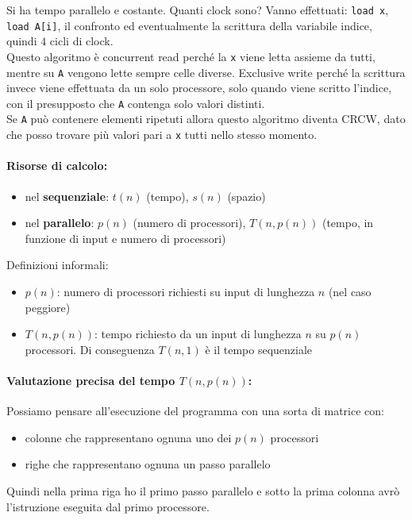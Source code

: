 Si ha tempo parallelo e costante. Quanti clock sono? Vanno effettuati: \texttt{load x}, \texttt{load A[i]}, il confronto ed eventualmente la scrittura della variabile indice, quindi $4$ cicli di clock.\\

Questo algoritmo è concurrent read perché la \texttt{x} viene letta assieme da tutti, mentre su \texttt{A} vengono lette sempre celle diverse. Exclusive write perché la scrittura invece viene effettuata da un solo processore, solo quando viene scritto l'indice, con il presupposto che \texttt{A} contenga solo valori distinti.\\

Se \texttt{A} può contenere elementi ripetuti allora questo algoritmo diventa CRCW, dato che posso trovare più valori pari a \texttt{x} tutti nello stesso momento.\\

\paragraph{Risorse di calcolo:}
\begin{itemize}
	\item nel \textbf{sequenziale}: $t(n)$ (tempo), $s(n)$ (spazio)
	\item nel \textbf{parallelo}: $p(n)$ (numero di processori), $T(n, p(n))$ (tempo, in funzione di input e numero di processori)
\end{itemize}

Definizioni informali: 
\begin{itemize}
	\item $p(n)$: numero di processori richiesti su input di lunghezza $n$ (nel caso peggiore)
	\item $T(n, p(n))$: tempo richiesto da un input di lunghezza $n$ su $p(n)$ processori. Di conseguenza $T(n, 1)$ è il tempo sequenziale 
\end{itemize}




\newpage

\paragraph{Valutazione precisa del tempo $T(n, p(n))$:} Possiamo pensare all'esecuzione del programma con una sorta di matrice con: 
\begin{itemize}
	\item colonne che rappresentano ognuna uno dei $p(n)$ processori
	\item righe che rappresentano ognuna un passo parallelo 
\end{itemize}
Quindi nella prima riga ho il primo passo parallelo e sotto la prima colonna avrò l'istruzione eseguita dal primo processore.\\

